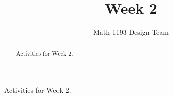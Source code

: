 \documentclass[noauthor]{ximera}
\title{Week 2}
\author{Math 1193 Design Team}
\begin{document}
\begin{abstract}
    Activities for Week 2.
\end{abstract}
\maketitle

Activities for Week 2.
\end{document}
